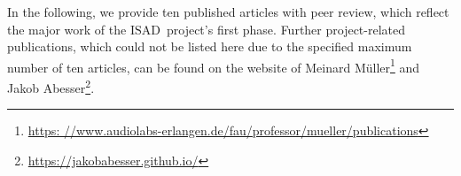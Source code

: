 \documentclass[11pt,a4paper]{article}
\def\PN{\mathrm{ISAD}}
\theoremstyle{plain} \newtheorem{define}{Definition}[section]
\begin{document}
{In the following, we provide ten published articles with peer review, which reflect the major work of the $\PN$~project's first phase. Further project-related publications, which could not be listed here due to the specified maximum number of ten articles, can be found on the website of Meinard M\"uller\footnote{\url{https: //www.audiolabs-erlangen.de/fau/professor/mueller/publications}} and Jakob Abesser\footnote{\url{https://jakobabesser.github.io/}}.


\nocite{TaenzerAMWLM19_InstrumentReco_ISMIR}
\nocite{AbesserMueller19_ContourClassification_ICASSP}
\nocite{MimilakisDCS19_DenoisingAutoencoders_TASLP}
\nocite{TaenzerMA21_LocalPolyphonyEstimation_Electronics}
\nocite{MimilakisWAAM19_SingingVDetWagner_MML}

\nocite{KrauseMW21_OperaSingingActivity_Electronics}
\nocite{WeissBAM18_JazzComplexity_ISMIR}
\nocite{ZalkowM20_WeaklyAlignedTrain_ISMIR}
\nocite{ZalkowBAM20_MTD_TISMIR}
\nocite{ZalkowBM19_SalienceRetrieval_ICASSP}

\nocite{WeissBM19_SoftTransitions_ICASSP}
\nocite{AbesserM21_JazzBassTranscription_Electronics}
\nocite{MuellerZ19_FMP_ISMIR}
\nocite{Abesser20_AcousticSceneClassification_AppliedSciences}
\nocite{AbesserBM18_BassSaliency_ISMIR}
\nocite{ZalkowM18_VergleichAutoencoderPCA_DAGA}

%
%


{\footnotesize
\begin{itemize}



\end{itemize}}}
\end{document}
